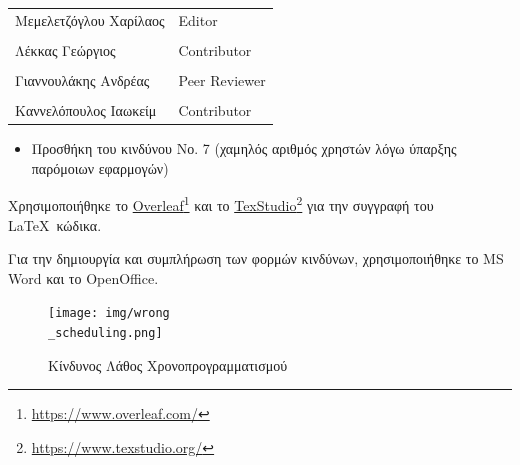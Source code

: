 \documentclass{../ol-softwaremanual}
\newcommand{\doclink}[2]{\href{#1}{#2}\footnote{\url{#1}}}
\begin{document}
	
	\vspace{20pt}
	
	\begin{table}[htbp!]
		\begin{tabular}{ll}
			Μεμελετζόγλου Χαρίλαος & \en Editor \\
			\\ Λέκκας Γεώργιος      &   \en  Contributor \\
			\\ Γιαννουλάκης Ανδρέας & \en Peer Reviewer \\
			\\ Καννελόπουλος Ιαωκείμ & \en Contributor \\ 
		\end{tabular}
	\end{table}

	\vspace{10pt}

	\begin{itemize}
		\item Προσθήκη του κινδύνου Νο. 7 (χαμηλός αριθμός χρηστών λόγω ύπαρξης παρόμοιων εφαρμογών)
	\end{itemize}

	
	
	\vspace{20pt}
	
	
	\vspace{20pt}
	\flushleft
	Χρησιμοποιήθηκε το \en \doclink{https://www.overleaf.com/}{Overleaf} \gr και το \en \doclink{https://www.texstudio.org/}{TexStudio} \gr για την συγγραφή του \LaTeX\ κώδικα. \break
	
	Για την δημιουργία και συμπλήρωση των φορμών κινδύνων, χρησιμοποιήθηκε το \en MS Word \gr και το \en OpenOffice\gr.
	
	
	
	
	\newpage 
	
	
	\flushleft
	
	\begin{figure}[htbp!]
		\texttt{[image: img/wrong\\\_scheduling.png]}
		\caption{Κίνδυνος Λάθος Χρονοπρογραμματισμού}
	\end{figure}
	
\end{document}
